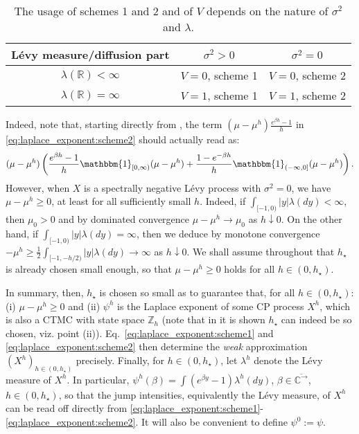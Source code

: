 \documentclass[pdftex,oneside,11pt,reqno]{amsart}
\theoremstyle{definition}
\theoremstyle{theorem}
\theoremstyle{remark}
\numberwithin{equation}{section}
\numberwithin{definition}{section}
\begin{document}
\begin{table}[!hbt]
\caption{The usage of schemes 1 and 2 and of $V$ depends on the nature of ${\sigma^2}$ and ${\lambda}$.
 }\label{table:reference}
\begin{center}
\begin{tabular}{|c|c|c|}\hline
 L\'evy measure/diffusion part& ${\sigma^2}>0$ & ${\sigma^2}=0$  \\\hline
${\lambda}(\mathbb{R})<\infty$ & $V=0$, scheme 1 & $V=0$, scheme 2\\\hline
${\lambda}(\mathbb{R})=\infty$  & $V=1$, scheme 1 & $V=1$, scheme 2\\\hline
\end{tabular}
\end{center}
\end{table}

Indeed, note that, starting directly from \cite[Eq.~(3.2)]{vidmarmijatovicsaul}, the term $({\mu}-{\mu}^h)\frac{e^{\beta h}-1}{h}$ in \eqref{eq:laplace_exponent:scheme2} should actually read as: $$(\mu-\mu^h)\left(\frac{e^{\beta h}-1}{h}\mathbbm{1}_{[0,\infty)}(\mu-\mu^h)+\frac{1-e^{-\beta h}}{h}\mathbbm{1}_{(-\infty,0]}(\mu-\mu^h)\right).$$ However, when $X$ is a spectrally negative L\'evy process with ${\sigma^2}=0$, we have $\mu-\mu^h\geq 0$, at least for all sufficiently small $h$. Indeed, if $\int_{[-1,0)}\vert y\vert{\lambda}(dy)<\infty$, then $\mu_0>0$ and by dominated convergence $\mu-\mu^h\to\mu_0$ as $h\downarrow 0$. On the other hand, if $\int_{[-1,0)}\vert y\vert{\lambda}(dy)=\infty$, then we deduce by monotone convergence $-\mu^h\geq \frac{1}{2}\int_{ [-1,-h/2)}\vert y\vert{\lambda}(dy)\to\infty$ as $h\downarrow 0$. We shall assume throughout that $h_\star$ is already chosen small enough, so that $\mu-\mu^h\geq 0$ holds for all $h\in (0,h_\star)$.

In summary, then, $h_\star$ is chosen so small as to guarantee that, for all $h\in (0,h_\star)$: (i) $\mu-\mu^h\geq 0$ and (ii) $\psi^h$ is the Laplace exponent of some CP process $X^h$, which is also a CTMC with state space ${\mathbb{Z}_h}$ (note that in \cite[Proposition 3.9]{vidmarmijatovicsaul} it is shown $h_\star$ can indeed be so chosen, viz. point (ii)). Eq.~\eqref{eq:laplace_exponent:scheme1} and \eqref{eq:laplace_exponent:scheme2} then determine the \emph{weak} approximation $(X^h)_{h\in (0,h_\star)}$ precisely.
Finally, for $h\in (0,h_\star)$, let ${\lambda}^h$ denote the L\'evy measure of
$X^h$. In particular, $\psi^h(\beta)=\int\left(e^{\beta
y}-1\right){\lambda}^h(dy)$, $\beta\in{\overline{\mathbb{C}^{\rightarrow}}}$, $h\in (0,h_\star)$, so that the jump intensities, equivalently the L\'evy measure, of $X^h$ can be read off directly from \eqref{eq:laplace_exponent:scheme1}-\eqref{eq:laplace_exponent:scheme2}. It will also be
convenient to define $\psi^0:=\psi$. 
\end{document}

